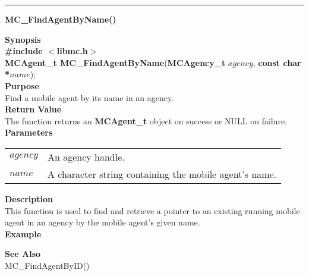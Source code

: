 \noindent
\vspace{5pt}
\rule{6.5in}{0.015in}
\noindent
{\LARGE \bf MC\_FindAgentByName()}\\
{}

\noindent
{\bf Synopsis}\\
{\bf \#include $<$libmc.h$>$}\\
{\bf MCAgent\_t MC\_FindAgentByName}({\bf MCAgency\_t} $agency$, {\bf const char *}$name$);\\

\noindent
{\bf Purpose}\\
Find a mobile agent by its name in an agency.\\

\noindent
{\bf Return Value}\\
The function returns an {\bf MCAgent\_t} object on success or NULL on failure.\\

\noindent
{\bf Parameters}
\vspace{-0.1in}
\begin{description}
\item               
\begin{tabular}{p{10 mm}p{145 mm}}
$agency$ & An agency handle.\\
$name$ & A character string containing the mobile agent's name.
\end{tabular}
\end{description}

\noindent
{\bf Description}\\
This function is used to find and retrieve a pointer to an existing running 
mobile agent in an agency by the mobile agent's given name.\\

\noindent
{\bf Example}\\
\noindent
{\footnotesize}

\noindent
{\bf See Also}\\
MC\_FindAgentByID()

